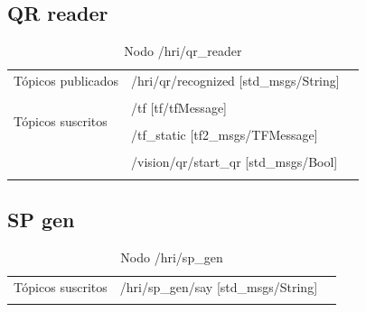 \documentclass[user_manual.tex]{subfiles}
\begin{document}
\subsection{QR reader}

\begin{table}[H]
\begin{center}
\begin{tabular}{|l|p{6cm}|p{5cm}|}%
\hline

Tópicos publicados
& /hri/qr/recognized [std\_msgs/String] &  \\
& & \\
\hline

\multirow{3}{*}{Tópicos suscritos}
& /tf [tf/tfMessage] &  \\
& & \\
& /tf\_static [tf2\_msgs/TFMessage] &  \\
& & \\
& /vision/qr/start\_qr [std\_msgs/Bool] &  \\
& & \\
\cline{1-3}

\end{tabular}
\caption{Nodo /hri/qr\_reader}
\label{qr reader node}
\end{center}
\end{table}

\subsection{SP gen}

\begin{table}[H]
\begin{center}
\begin{tabular}{|l|p{6cm}|p{5cm}|}%
\hline

Tópicos suscritos
& /hri/sp\_gen/say [std\_msgs/String] &  \\
& & \\
\hline

\end{tabular}
\caption{Nodo /hri/sp\_gen}
\label{sp gen node}
\end{center}
\end{table}
\end{document}

